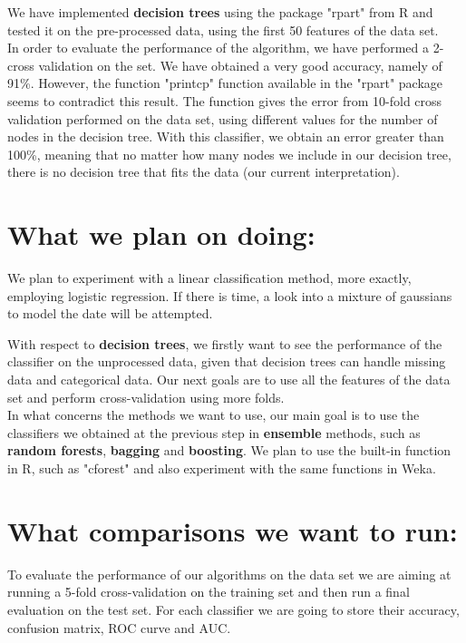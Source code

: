 \documentclass[a4paper,11pt]{article}
\begin{document}
We have implemented \textbf{decision trees} using the package "rpart" from R and tested it on the pre-processed data, using the first 50 features of the data set. \\
\indent  In order to evaluate the performance of the algorithm, we have performed a 2-cross validation on the set. We have obtained a very good accuracy, namely of 91\%. However, the function "printcp" function available in the "rpart" package seems to contradict this result. The function gives the error from 10-fold cross validation performed on the data set, using different values for the number of nodes in the decision tree. With this classifier, we obtain an error greater than 100\%, meaning that no matter how many nodes we include in our decision tree, there is no decision tree that fits the data (our current interpretation).

\section*{What we plan on doing:}

We plan to experiment with a linear classification method, more exactly, employing logistic regression. If there is time, a look into a mixture of gaussians to model the date will be attempted. 

With respect to \textbf{decision trees}, we firstly want to see the performance of the classifier on the unprocessed data, given that decision trees can handle missing data and categorical data. Our next goals are to  use all the features of the data set and perform cross-validation using more folds. \\

In what concerns the methods we want to use, our main goal is to use the classifiers we obtained at the previous step in \textbf{ensemble} methods, such as \textbf{random forests}, \textbf{bagging} and \textbf{boosting}. We plan to use the built-in function in R, such as "cforest" and also experiment with the same functions in Weka.

\section*{What comparisons we want to run:}

To evaluate the performance of our algorithms on the data set we are aiming at running a  5-fold cross-validation on the training set and then run a final evaluation on the test set. For each classifier we are going to store their accuracy, confusion matrix, ROC curve and AUC.
\end{document}
